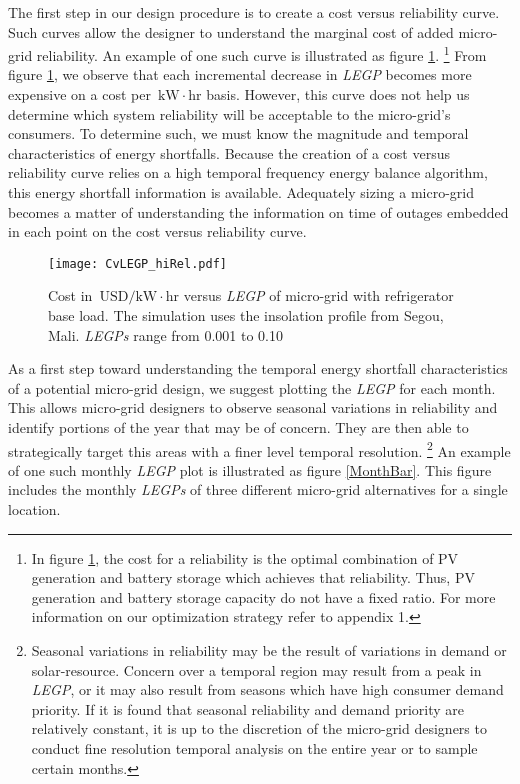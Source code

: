 \documentclass{article}
\newcommand{\unit}[1]{\ensuremath{\, \mathrm{#1}}}
\begin{document}
The first step in our design procedure is to create a cost versus reliability curve. 
Such curves allow the designer to understand the marginal cost of added micro-grid reliability.
An example of one such curve is illustrated as figure \ref{CVsLEGP}.
	\footnote{In figure \ref{CVsLEGP}, the cost for a reliability is the optimal 	combination of PV generation and battery storage which achieves that
	reliability.
Thus, PV generation and battery storage capacity do not have a fixed ratio. 
For more information on our optimization strategy refer to appendix 1.}
From figure \ref{CVsLEGP}, we observe that each incremental decrease in \emph{LEGP} becomes more expensive on a cost per \unit{kW\! \cdot \! hr} basis.
However, this curve does not help us determine which system reliability will be acceptable to the micro-grid's consumers.
To determine such, we must know the magnitude and temporal characteristics of energy shortfalls. 
Because the creation of a cost versus reliability curve relies on a high temporal frequency energy balance algorithm, this energy shortfall information is available. 
Adequately sizing a micro-grid becomes a matter of understanding the information on time of outages embedded in each point on the cost versus reliability curve. 


\begin{figure}[ht] 
  \centering
    \texttt{[image: CvLEGP\_hiRel.pdf]}
  \caption{Cost in \unit{USD/kW\! \cdot \! hr} versus \emph{LEGP} of 
micro-grid with refrigerator base load.
The simulation uses the insolation profile from Segou, Mali.
\emph{LEGPs} range from 0.001 to 0.10}
\label{CVsLEGP}
\end{figure}


As a first step toward understanding the temporal energy shortfall characteristics of a potential micro-grid design, we suggest plotting the \emph{LEGP} for each month. 
This allows micro-grid designers to observe seasonal variations in reliability and identify portions of the year that may be of concern.
They are then able to strategically target this areas with a finer level temporal resolution.
	\footnote{Seasonal variations in reliability may be the
	 result of variations in demand or solar-resource.
	Concern over a temporal region may result from a peak in \emph{LEGP}, or it 
	may also result from seasons which have high consumer demand priority.
	If it is found that seasonal reliability and demand priority are relatively 	
	constant, it is up to the discretion of the micro-grid designers to 
	conduct fine resolution temporal analysis on the entire year or to sample 	 
	certain months.}
An example of one such monthly \emph{LEGP} plot is illustrated as figure \ref{MonthBar}. 
This figure includes the monthly \emph{LEGPs} of three different micro-grid alternatives for a single location.
	
\end{document}
